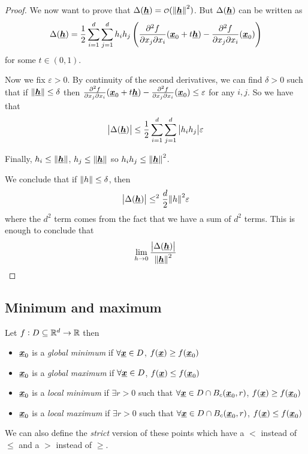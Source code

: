 \documentclass[12pt]{extarticle}
\renewcommand{\vec}[1]{\uvec{#1}}
\begin{document}
\begin{proof}
    We now want to prove that $\Delta(\vec h) = \o(\norm {\vec h}^2)$. But $\Delta(\vec h)$ can be written as
    \begin{equation}
        \Delta(\vec h) = \frac{1}{2}  \sum^d_{i = 1} \sum^d_{j = 1} h_i h_j \left( \pdv[2]{f}{x_j}{x_i}\/(\vec x_0 + t \vec h)- \pdv[2]{f}{x_j}{x_i}\/(\vec x_0)\right)
    \end{equation}
    for some $t \in (0, 1)$.

    Now we fix $\varepsilon > 0$. By continuity of the second derivatives, we can find $\delta > 0$ such that if $\norm {\vec{h}} \leq \delta$ then $ \pdv[2]{f}{x_j}{x_i}\/(\vec x_0 + t \vec h)- \pdv[2]{f}{x_j}{x_i}\/(\vec x_0) \leq \varepsilon$ for any $i, j$.
    So we have that
    \begin{equation}
        \abs{\Delta(\vec h)} \leq \frac{1}{2}  \sum^d_{i = 1} \sum^d_{j = 1} \abs{h_i h_j} \varepsilon
    \end{equation}

    Finally, $h_i \leq \norm{\vec{h}}$, $h_j \leq \norm{\vec{h}}$ so $h_i h_j \leq \norm{\vec{h}}^2$.

    We conclude that if $\norm{h} \leq \delta$, then
    \begin{equation}
        \abs{\Delta(\vec h)} \leq^2 \frac{d}{2} \norm{h}^2 \varepsilon
    \end{equation}
    where the $d^2$ term comes from the fact that we have a sum of $d^2$ terms.
    This is enough to conclude that
    \begin{equation}
        \lim_{h \to 0} \frac{\abs{\Delta(\vec h)}}{\norm{\vec h}^2}
    \end{equation}
\end{proof}

\subsection{Minimum and maximum}

\begin{definition}
    Let $f: D\subseteq \mathbb{R}^d \to \mathbb{R}$ then
    \begin{itemize}
        \item $\vec x_0$ is a \emph{global minimum} if $\forall \vec x \in D$, $f(\vec x) \geq f(\vec x_0)$
        \item $\vec x_0$ is a \emph{global maximum} if $\forall \vec x \in D$, $f(\vec x) \leq f(\vec x_0)$
        \item $\vec x_0$ is a \emph{local minimum} if $\exists r > 0$ such that $\forall \vec x \in D \cap B_c(\vec x_0, r)$, $f(\vec x) \geq f(\vec x_0)$
        \item $\vec x_0$ is a \emph{local maximum} if $\exists r > 0$ such that $\forall \vec x \in D \cap B_c(\vec x_0, r)$, $f(\vec x) \leq f(\vec x_0)$
    \end{itemize}

    We can also define the \emph{strict} version of these points which have a $<$ instead of $\leq$ and a $>$ instead of $\geq$.
\end{definition}
\end{document}
